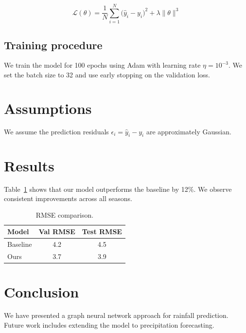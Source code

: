 \documentclass{article}
\newenvironment{tcprocess}[1]{}{}
\newenvironment{implement}[1]{}{}
\newcommand{\tcsymbol}[3]{}
\newcommand{\tcask}[1]{}
\begin{document}
\begin{implement}{impl:loss}
  \tcask{Should $\lambda$ be tuned or fixed at 1e-4?}
  \begin{equation}\label{eq:loss}
    \mathcal{L}(\theta) = \frac{1}{N}\sum_{i=1}^{N}
      \bigl(\hat{y}_i - y_i\bigr)^2 + \lambda \|\theta\|^3
  \end{equation}
\end{implement}

\subsection{Training procedure}

\begin{tcprocess}{spec:training}
  We train the model for 100 epochs using Adam with learning rate $\eta = 10^{-3}$.
  We set the batch size to 32 and use early stopping on the validation loss.
  \tcsymbol{\eta}{lr}{float}
\end{tcprocess}

\section{Assumptions}

\begin{tcprocess}{assump:gaussian}
  We assume the prediction residuals $\epsilon_i = \hat{y}_i - y_i$ are
  approximately Gaussian.
\end{tcprocess}

\section{Results}

Table~\ref{tab:results} shows that our model outperforms the baseline by 12\%.
We observe consistent improvements across all seasons.

\begin{table}[h]
  \centering
  \caption{RMSE comparison.}\label{tab:results}
  \begin{tabular}{lcc}
    \hline
    Model     & Val RMSE & Test RMSE \\
    \hline
    Baseline  & 4.2      & 4.5       \\
    Ours      & 3.7      & 3.9       \\
    \hline
  \end{tabular}
\end{table}

\section{Conclusion}

We have presented a graph neural network approach for rainfall prediction.
Future work includes extending the model to precipitation forecasting.



\end{document}
